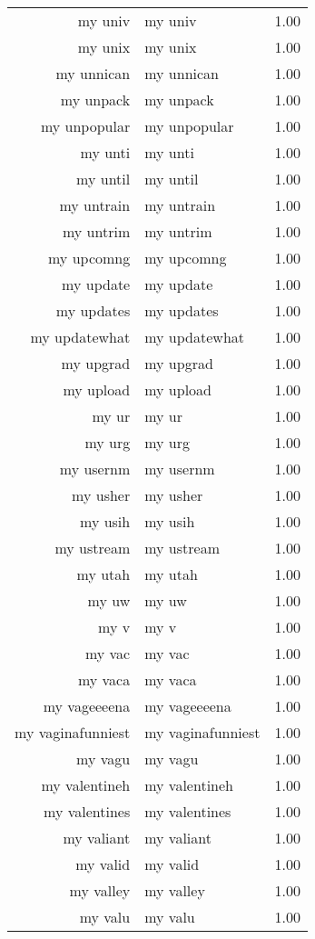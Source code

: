 \begin{table}[ht]
\begin{tabular}{rlr}
  my univ & my univ & 1.00 \\ 
  my unix & my unix & 1.00 \\ 
  my unnican & my unnican & 1.00 \\ 
  my unpack & my unpack & 1.00 \\ 
  my unpopular & my unpopular & 1.00 \\ 
  my unti & my unti & 1.00 \\ 
  my until & my until & 1.00 \\ 
  my untrain & my untrain & 1.00 \\ 
  my untrim & my untrim & 1.00 \\ 
  my upcomng & my upcomng & 1.00 \\ 
  my update & my update & 1.00 \\ 
  my updates & my updates & 1.00 \\ 
  my updatewhat & my updatewhat & 1.00 \\ 
  my upgrad & my upgrad & 1.00 \\ 
  my upload & my upload & 1.00 \\ 
  my ur & my ur & 1.00 \\ 
  my urg & my urg & 1.00 \\ 
  my usernm & my usernm & 1.00 \\ 
  my usher & my usher & 1.00 \\ 
  my usih & my usih & 1.00 \\ 
  my ustream & my ustream & 1.00 \\ 
  my utah & my utah & 1.00 \\ 
  my uw & my uw & 1.00 \\ 
  my v & my v & 1.00 \\ 
  my vac & my vac & 1.00 \\ 
  my vaca & my vaca & 1.00 \\ 
  my vageeeena & my vageeeena & 1.00 \\ 
  my vaginafunniest & my vaginafunniest & 1.00 \\ 
  my vagu & my vagu & 1.00 \\ 
  my valentineh & my valentineh & 1.00 \\ 
  my valentines & my valentines & 1.00 \\ 
  my valiant & my valiant & 1.00 \\ 
  my valid & my valid & 1.00 \\ 
  my valley & my valley & 1.00 \\ 
  my valu & my valu & 1.00 \\ 

\end{tabular}
\end{table}
